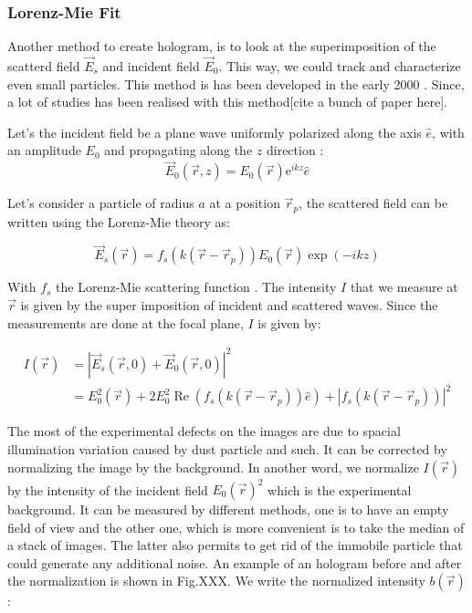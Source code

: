 \subsubsection{Lorenz-Mie Fit}


Another method to create hologram, is to look at the superimposition of the scatterd field $\vec{E}_s$ and incident field $\vec{E}_0$. This way, we could track and characterize even small particles. This method is has been developed in the early 2000 \cite{ovryn_imaging_2000, lee_characterizing_2007}. Since, a lot of studies has been realised with this method[cite a bunch of paper here]. 

Let's the incident field be a plane wave uniformly polarized along the axis $ \hat{e}$, with an amplitude $E_0$ and propagating along the $z$ direction :
\begin{equation}
	\vec{E}_0(\vec{r},z) = E_0(\vec{r}) \mathrm{e}^{ikz}\hat{e}
\end{equation}

Let's consider a particle of radius $a$ at a position $\vec{r}_p $, the scattered field can be written using the Lorenz-Mie theory \cite{f_bohren_absorption_1998} as:

\begin{equation}
	\vec{E}_s(\vec{r}) =  f_s(k(\vec{r} - \vec{r}_p))E_0(\vec{r}) \exp \left(-ikz\right) 
\end{equation} 

With $f_s$ the Lorenz-Mie scattering function \cite{f_bohren_absorption_1998}. The intensity $I$ that we measure at $\vec{r}$ is given by the super imposition of incident and scattered waves. Since the measurements are done at the focal plane, $I$ is given by:

\begin{equation}
	\begin{aligned}
	I(\vec{r}) & = |\vec{E}_s(\vec{r}, 0) + \vec{E}_0(\vec{r}, 0)|^2 \\
	& = E_0^2(\vec{r}) + 2 E_0^2\operatorname{Re} \left(f_s(k(\vec{r}- \vec{r}_p)) \hat{e}\right) + | f_s(k(\vec{r}- \vec{r}_p)) |^2
	\end{aligned}
\end{equation}

The most of the experimental defects on the images are due to spacial illumination variation caused by dust particle and such. It can be corrected by normalizing the image by the background. In another word, we normalize  $I(\vec{r})$ by the intensity of the incident field $E_0(\vec{r})^2$ which is the experimental background. It can be measured by different methods, one is to have an empty field of view and the other one, which is more convenient is to take the median of a stack of images. The latter also permits to get rid of the immobile particle that could generate any additional noise. An example of an hologram before and after the normalization is shown in Fig.XXX. We write the normalized intensity $b(\vec{r})$:


